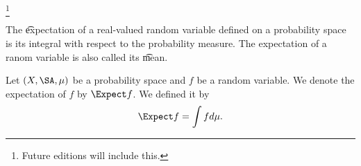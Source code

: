 

\footnote{Future editions will include this.}


The \t{expectation}
of a real-valued random variable
defined on a probability space
is its integral
with respect to
the probability measure.
The expectation of a ranom variable is also called its \t{mean}.


Let $(X, \SA, \mu)$
be a probability space
and $f$ be a random variable.
We denote the expectation
of $f$ by $\Expect f$.
We defined it by
\[
  \Expect f = \int f d\mu.
\]

\blankpage
